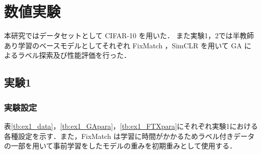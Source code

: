 \newpage
\changeindent{0cm}
\section{数値実験}
\changeindent{2cm}

本研究ではデータセットとして CIFAR-10\cite{krizhevsky2009learning} を用いた．
また実験1，2では半教師あり学習のベースモデルとしてそれぞれ FixMatch ，SimCLR を用いて GA によるラベル探索及び性能評価を行った．

\changeindent{0cm}
\subsection{実験1}
\changeindent{2cm}

\changeindent{0cm}
\subsubsection{実験設定}
\changeindent{2cm}
表\ref{tb:ex1_data}，\ref{tb:ex1_GApara}，\ref{tb:ex1_FTXpara}にそれぞれ実験1における
各種設定を示す．また，FixMatch は学習に時間がかかるためラベル付きデータの一部を用いて事前学習をしたモデルの重みを初期重みとして使用する．

\begin{table}[h]
	\centering
	\caption{実験1 : データ内訳\label{tb:ex1_data}}
\end{table}


\begin{table}[h]
	\centering
	\caption{実験1 : GAの設定\label{tb:ex1_GApara}}
\end{table}


